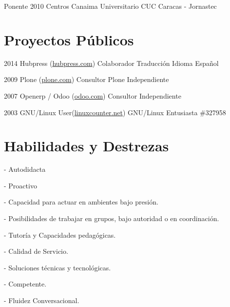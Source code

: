 \documentclass{tccv}
\begin{document}
\begin{cyp}

\item[Ponente]{2010}
     {Centros Canaima Universitario}
     {CUC Caracas - Jornastec} 

\end{cyp}

\section{Proyectos P\'ublicos}

\begin{proyectos}

\item{2014}
     {Hubpress (\href{https://www.hubpress.com/}{hubpress.com})}
     {Colaborador Traducci\'on Idioma Espa\~nol}

\item{2009}
     {Plone (\href{https://plone.org/support/providers/javier-leon}{plone.com})}
     {Consultor Plone Independiente}

\item{2007}
     {Openerp / Odoo (\href{http://www.odoo.com/}{odoo.com})}
     {Consultor Independiente}

\item{2003}
     {GNU/Linux User(\href{http://linuxcounter.net/user/327958.html}{linuxcounter.net})}
     {GNU/Linux Entusiasta \#327958}
 
\end{proyectos}

\section{Habilidades y Destrezas}

\begin{habilidades}

\item{- Autodidacta}\\
\item{- Proactivo}\\
\item{- Capacidad para actuar en ambientes bajo presi\'on.}\\
\item{- Posibilidades de trabajar en grupos, bajo autoridad o en coordinaci\'on.}\\
\item{- Tutor\'ia y Capacidades pedag\'ogicas.}\\
\item{- Calidad de Servicio.}\\
\item{- Soluciones t\'ecnicas y tecnol\'ogicas.}\\
\item{- Competente.}\\
\item{- Fluidez Conversacional.}\\

\end{habilidades}
\end{document}
